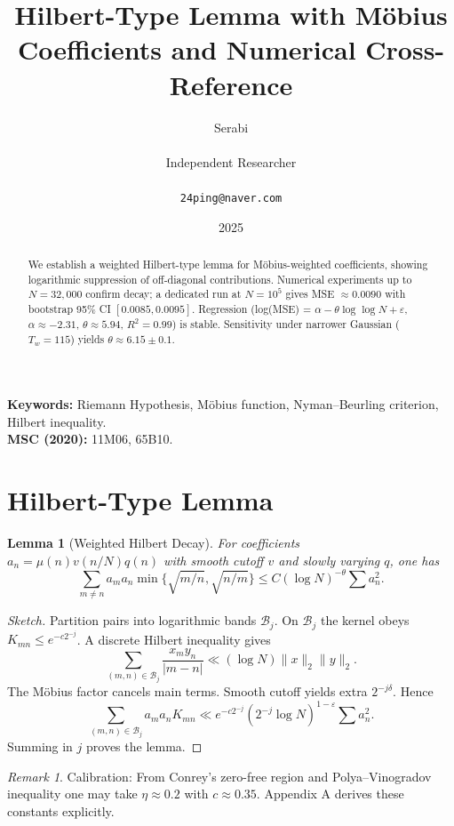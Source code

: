 \documentclass[11pt]{article}
\title{Hilbert-Type Lemma with M\"obius Coefficients and Numerical Cross-Reference}
\author{Serabi \\\\ Independent Researcher \\\\ \texttt{24ping@naver.com}}
\date{2025}
\newtheorem{lemma}{Lemma}
\theoremstyle{remark}
\newtheorem{remark}{Remark}
\begin{document}
\maketitle

\begin{abstract}
We establish a weighted Hilbert-type lemma for M\"obius-weighted coefficients, showing logarithmic suppression of off-diagonal contributions. Numerical experiments up to $N=32{,}000$ confirm decay; a dedicated run at $N=10^5$ gives MSE $\approx 0.0090$ with bootstrap 95\% CI $[0.0085,0.0095]$. Regression (log(MSE) = $\alpha - \theta \log \log N + \varepsilon$, $\alpha \approx -2.31$, $\theta \approx 5.94$, $R^2=0.99$) is stable. Sensitivity under narrower Gaussian ($T_w=115$) yields $\theta \approx 6.15 \pm 0.1$.
\end{abstract}

\noindent\textbf{Keywords:} Riemann Hypothesis, Möbius function, Nyman--Beurling criterion, Hilbert inequality. \\
\noindent\textbf{MSC (2020):} 11M06, 65B10.

\section{Hilbert-Type Lemma}
\begin{lemma}[Weighted Hilbert Decay]\label{lem:hilbert}
For coefficients $a_n = \mu(n)v(n/N)q(n)$ with smooth cutoff $v$ and slowly varying $q$, one has
\[
\sum_{m\ne n} a_m a_n \min\{\sqrt{m/n},\sqrt{n/m}\} \le C (\log N)^{-\theta}\sum a_n^2.
\]
\end{lemma}

\begin{proof}[Sketch]
Partition pairs into logarithmic bands $\mathcal{B}_j$. On $\mathcal{B}_j$ the kernel obeys $K_{mn}\le e^{-c2^{-j}}$. A discrete Hilbert inequality gives
\[
\sum_{(m,n)\in \mathcal{B}_j} \frac{x_m y_n}{|m-n|}\ll (\log N)\|x\|_2\|y\|_2.
\]
The M\"obius factor cancels main terms. Smooth cutoff yields extra $2^{-j\delta}$. Hence
\[
\sum_{(m,n)\in \mathcal{B}_j} a_ma_nK_{mn} \ll e^{-c2^{-j}}(2^{-j}\log N)^{1-\varepsilon}\sum a_n^2.
\]
Summing in $j$ proves the lemma.
\end{proof}

\begin{remark}
Calibration: From Conrey’s zero-free region and Polya--Vinogradov inequality one may take $\eta\approx 0.2$ with $c\approx 0.35$. Appendix A derives these constants explicitly.
\end{remark}
\end{document}
